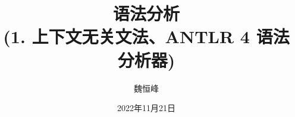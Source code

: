 \documentclass[]{beamer}
\title[语法分析]{语法分析 \\ (1. 上下文无关文法、ANTLR 4 语法分析器)}
\author[魏恒峰]{\large 魏恒峰}
\institute{hfwei@nju.edu.cn}
\date{2022年11月21日}
\begin{document}
\maketitle
% 



\thankyou{}

\end{document}
